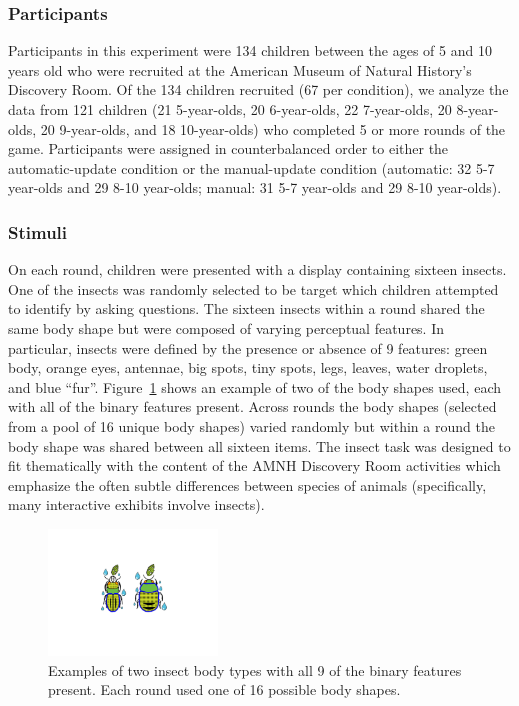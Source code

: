 \documentclass[man,floatsintext]{apa6}
\begin{document}
\subsubsection{Participants}

Participants in this experiment were 134 children between the ages of 5 and 10 
years old who were recruited at the American Museum of Natural History's 
Discovery Room. Of the 134 children recruited (67 per condition), we analyze the data from 121 
children (21 5-year-olds, 20 6-year-olds, 22 7-year-olds, 20 8-year-olds, 20 9-year-olds, 
and 18 10-year-olds) who completed 5 or more rounds of the game.
Participants were assigned in counterbalanced order to either 
the automatic-update condition or the manual-update condition (automatic: 32 5-7 year-olds and 29 8-10 year-olds; manual: 31 5-7 year-olds and 29 8-10 year-olds).

\subsubsection{Stimuli}

On each round, children were presented with a display containing sixteen insects.  One of the insects was randomly
selected to be target which children attempted to identify by asking questions.  The sixteen insects within a round shared the same body 
shape but were composed of varying perceptual features.  In particular, insects were defined by the presence or absence 
of 9 features: green body, orange eyes, antennae, big spots, tiny spots, 
legs, leaves, water droplets, and blue ``fur''. Figure~\ref{fig:example_bugs} shows an example of two of the body shapes used, 
each with all of the binary features present.   Across rounds the body shapes (selected from a pool of 
16 unique body shapes) varied randomly but within a round the body shape was shared between all sixteen items.  The insect task 
was designed to fit thematically with the content of the AMNH Discovery Room activities which emphasize the often subtle differences 
between species of animals (specifically, many interactive exhibits involve insects).


\begin{figure}[h]
  \centering
  \includegraphics[width=0.4\textwidth]{figures/example_bugs}
  \caption{Examples of two insect body types with all 9 of the binary features present. Each round used one of 16 possible 
body shapes. } %
  \label{fig:example_bugs}
\end{figure} 
\end{document}
